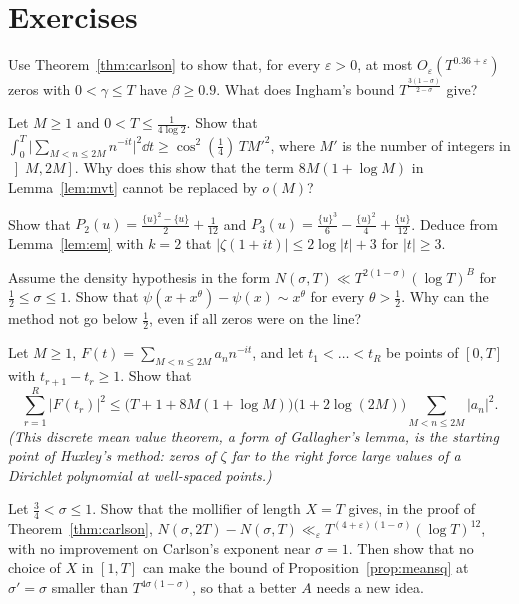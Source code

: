 \section{Exercises}

\begin{exercise}[$\star$]\label{ex:carlsonnum}
Use Theorem~\ref{thm:carlson} to show that, for every $\varepsilon>0$, at most $O_\varepsilon(T^{0.36+\varepsilon})$ zeros with $0<\gamma\le T$ have $\beta\ge0.9$. What does Ingham's bound $T^{\frac{3(1-\sigma)}{2-\sigma}}$ give?
\end{exercise}

\begin{exercise}[$\star$]\label{ex:mvtsharp}
Let $M\ge1$ and $0<T\le\frac1{4\log2}$. Show that
$\int_0^T\bigl|\sum_{M<n\le2M}n^{-it}\bigr|^2\dd t\ge\cos^2(\frac14)\,TM'^2$, where $M'$ is the number of integers in $\left]M,2M\right]$. Why does this show that the term $8M(1+\log M)$ in Lemma~\ref{lem:mvt} cannot be replaced by $o(M)$?
\end{exercise}

\begin{exercise}[$\star$]\label{ex:pk}
Show that $P_2(u)=\frac{\{u\}^2-\{u\}}2+\frac1{12}$ and $P_3(u)=\frac{\{u\}^3}6-\frac{\{u\}^2}4+\frac{\{u\}}{12}$. Deduce from Lemma~\ref{lem:em} with $k=2$ that $|\zeta(1+it)|\le2\log|t|+3$ for $|t|\ge3$.
\end{exercise}

\begin{exercise}[$\star\star$]\label{ex:dh}
Assume the density hypothesis in the form $N(\sigma,T)\ll T^{2(1-\sigma)}(\log T)^B$ for $\frac12\le\sigma\le1$. Show that $\psi(x+x^\theta)-\psi(x)\sim x^\theta$ for every $\theta>\frac12$. Why can the method not go below $\frac12$, even if all zeros were on the line?
\end{exercise}

\begin{exercise}[$\star\star$]\label{ex:discrete}
Let $M\ge1$, $F(t)=\sum_{M<n\le2M}a_nn^{-it}$, and let $t_1<\dots<t_R$ be points of $[0,T]$ with $t_{r+1}-t_r\ge1$. Show that
\[
\sum_{r=1}^R|F(t_r)|^2\le\bigl(T+1+8M(1+\log M)\bigr)\bigl(1+2\log(2M)\bigr)\sum_{M<n\le2M}|a_n|^2.
\]
\emph{(This discrete mean value theorem, a form of Gallagher's lemma, is the starting point of Huxley's method: zeros of $\zeta$ far to the right force large values of a Dirichlet polynomial at well-spaced points.)}
\end{exercise}

\begin{exercise}[$\star\star\star$]\label{ex:density1}
Let $\frac34<\sigma\le1$. Show that the mollifier of length $X=T$ gives, in the proof of Theorem~\ref{thm:carlson}, $N(\sigma,2T)-N(\sigma,T)\ll_\varepsilon T^{(4+\varepsilon)(1-\sigma)}(\log T)^{12}$, with no improvement on Carlson's exponent near $\sigma=1$. Then show that no choice of $X$ in $[1,T]$ can make the bound of Proposition~\ref{prop:meansq} at $\sigma'=\sigma$ smaller than $T^{4\sigma(1-\sigma)}$, so that a better $A$ needs a new idea.
\end{exercise}

